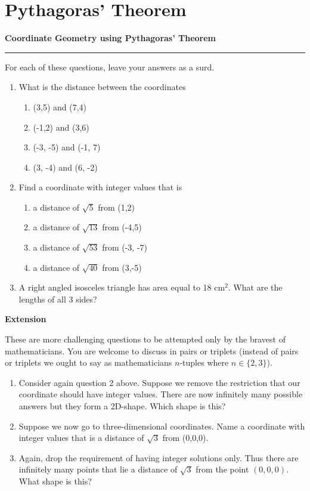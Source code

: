 \documentclass{article}
\begin{document}
\newpage
\section{Pythagoras' Theorem}

\newpage

\noindent \textbf{Coordinate Geometry using Pythagoras' Theorem}
\medskip
\hrule
\medskip

\noindent For each of these questions, leave your answers as a surd.

\begin{enumerate}
    \item What is the distance between the coordinates \begin{enumerate}
        \item (3,5) and (7,4)
        \item (-1,2) and (3,6)
        \item (-3, -5) and (-1, 7)
        \item (3, -4) and (6, -2)
    \end{enumerate}
    \item Find a coordinate with integer values that is
    \begin{enumerate}
        \item a distance of \(\sqrt{5}\) from (1,2)
        \item a distance of \(\sqrt{13}\) from (-4,5)
        \item a distance of \(\sqrt{53}\) from (-3, -7)
        \item a distance of \(\sqrt{40}\) from (3,-5)
    \end{enumerate}
    \item A right angled isosceles triangle has area equal to 18 cm\(^2\). What are the lengths of all 3 sides?
\end{enumerate}

\noindent \textbf{Extension}

\medskip

These are more challenging questions to be attempted only by the bravest of mathematicians. You are welcome to discuss in pairs or triplets (instead of pairs or triplets we ought to say as mathematicians \(n\)-tuples where \(n \in \{2,3\}\)).

\begin{enumerate}
    \item Consider again question 2 above. Suppose we remove the restriction that our coordinate should have integer values. There are now infinitely many possible answers but they form a 2D-shape. Which shape is this?
    \item Suppose we now go to three-dimensional coordinates. Name a coordinate with integer values that is a distance of \(\sqrt{3}\) from (0,0,0).
    \item Again, drop the requirement of having integer solutions only. Thus there are infinitely many points that lie a distance of \(\sqrt{3}\) from the point \((0,0,0)\). What shape is this?
\end{enumerate}
\end{document}
